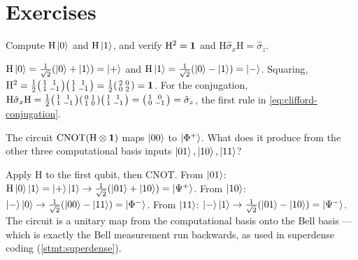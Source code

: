 \section*{Exercises}

\begin{exercise}
Compute $\mathrm{H}\ket{0}$ and $\mathrm{H}\ket{1}$, and verify
$\mathrm{H}^2=\mathbf{1}$ and $\mathrm{H}\hat\sigma_x\mathrm{H}=\hat\sigma_z$.
\begin{solution}
$\mathrm{H}\ket{0}=\tfrac{1}{\sqrt2}(\ket{0}+\ket{1})=\ket{+}$ and
$\mathrm{H}\ket{1}=\tfrac{1}{\sqrt2}(\ket{0}-\ket{1})=\ket{-}$. Squaring,
$\mathrm{H}^2=\tfrac12\begin{psmallmatrix}1&1\\1&-1\end{psmallmatrix}
\begin{psmallmatrix}1&1\\1&-1\end{psmallmatrix}
=\tfrac12\begin{psmallmatrix}2&0\\0&2\end{psmallmatrix}=\mathbf{1}$. For the
conjugation, $\mathrm{H}\hat\sigma_x\mathrm{H}
=\tfrac12\begin{psmallmatrix}1&1\\1&-1\end{psmallmatrix}
\begin{psmallmatrix}0&1\\1&0\end{psmallmatrix}
\begin{psmallmatrix}1&1\\1&-1\end{psmallmatrix}
=\begin{psmallmatrix}1&0\\0&-1\end{psmallmatrix}=\hat\sigma_z$, the
first rule in \cref{eq:clifford-conjugation}.
\end{solution}
\end{exercise}

\begin{exercise}
The circuit $\mathrm{CNOT}(\mathrm{H}\otimes\mathbf{1})$ maps $\ket{00}$ to
$\ket{\Phi^+}$. What does it produce from the other three computational
basis inputs $\ket{01},\ket{10},\ket{11}$?
\begin{solution}
Apply $\mathrm{H}$ to the first qubit, then CNOT. From $\ket{01}$:
$\mathrm{H}\ket{0}\ket{1}=\ket{+}\ket{1}\to\tfrac{1}{\sqrt2}(\ket{01}+\ket{10})=\ket{\Psi^+}$.
From $\ket{10}$:
$\ket{-}\ket{0}\to\tfrac{1}{\sqrt2}(\ket{00}-\ket{11})=\ket{\Phi^-}$.
From $\ket{11}$:
$\ket{-}\ket{1}\to\tfrac{1}{\sqrt2}(\ket{01}-\ket{10})=\ket{\Psi^-}$.
The circuit is a unitary map from the computational basis onto the Bell
basis --- which is exactly the Bell measurement run backwards, as used
in superdense coding (\cref{stmt:superdense}).
\end{solution}
\end{exercise}

